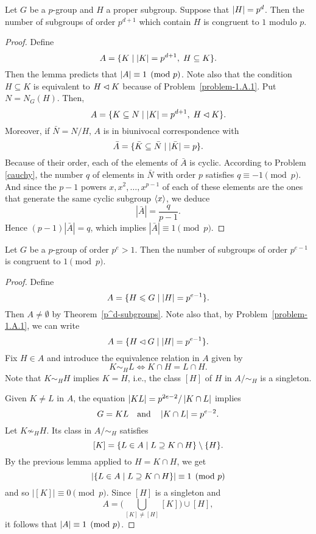 \begin{lem}\label{lemma1}
     Let\/ $G$ be a $p$-group and $H$ a proper subgroup. Suppose that $\left\vert{H}\right\vert=p^d$. Then the number of subgroups of order $p^{d+1}$ which contain $H$ is congruent to $1$ modulo $p$.
\end{lem}

\begin{proof} Define
$$
    A=\{K\mid \left\vert{K}\right\vert=p^{d+1},\; H\subseteq K\}.
$$
Then the lemma predicts that $\left\vert{A}\right\vert\equiv1\pmod p$. Note also that the condition $H\subseteq K$ is equivalent to $H\lhd K$ because of Problem~\ref{problem-1.A.1}. Put $N=N_G(H)$. Then,
$$
    A=\{K\subseteq N\mid \left\vert{K}\right\vert=p^{d+1},\; H\lhd K\}.
$$
Moreover, if $\bar N=N/H$, $A$ is in biunivocal correspondence with
$$
    \bar A=\{\bar K\subseteq\bar N\mid|\bar K|=p\}.
$$
Because of their order, each of the elements of $\bar A$ is cyclic. According to Problem \ref{cauchy}, the number $q$ of elements in $\bar N$ with order $p$ satisfies $q\equiv-1\pmod p$. And since the $p-1$ powers $x, x^2,\dots, x^{p-1}$ of each of these elements are the ones that generate the same cyclic subgroup $\langle x\rangle$, we deduce
$$
    |\bar A| = \frac q{p-1}.
$$
Hence $(p-1)|\bar A|=q$, which implies $|\bar A|\equiv1\pmod p$.  \end{proof}

\begin{lem}\label{lemma2}
    Let\/ $G$ be a $p$-group of order $p^e>1$. Then the number of subgroups of order\/ $p^{e-1}$ is congruent to $1\pmod{p}$.
\end{lem}

\begin{proof} Define
$$
    A = \{H\leqslant G\mid\left\vert{H}\right\vert=p^{e-1}\}.
$$
Then $A\ne\emptyset$ by Theorem~\ref{p^d-subgroups}. Note also that, by Problem~\ref{problem-1.A.1}, we can write
$$
    A = \{H\lhd G\mid\left\vert{H}\right\vert=p^{e-1}\}.
$$
Fix $H\in A$ and introduce the equivalence relation in $A$ given by
$$
    K\sim_H L\iff K\cap H= L\cap H.
$$
Note that $K\sim_HH$ implies $K=H$, i.e., the class $[H]$ of $H$ in $A/{\sim_H}$ is a singleton.

Given $K\ne L$ in $A$, the equation $\left\vert{KL}\right\vert=p^{2e-2}/\left\vert{K\cap L}\right\vert$ implies
$$
    G = KL\quad\text{and}\quad\left\vert{K\cap L}\right\vert=p^{e-2}.
$$
Let $K\not\sim_HH$. Its class in $A/{\sim_H}$ satisfies
$$
    [K] = \{L\in A\mid L\supseteq K\cap H\}\setminus\{H\}.
$$
By the previous lemma applied to $H=K\cap H$, we get 
$$
    |\{L\in A\mid L\supseteq K\cap H\}| \equiv 1\pmod p
$$
and so $|[K]|\equiv0\pmod p$. Since $[H]$ is a singleton and
$$
    A = \bigg(\bigcup_{[K]\ne[H]}[K]\bigg)\cup [H],
$$
it follows that $\left\vert{A}\right\vert\equiv1\pmod p$.  \end{proof}

